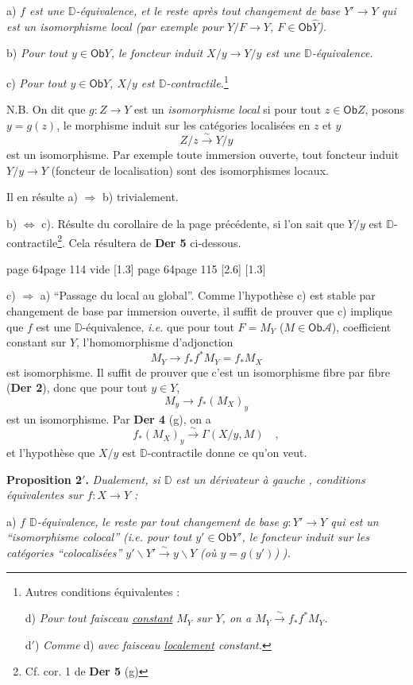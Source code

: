 \documentclass[11pt,leqno]{article}
\newcommand{\msp}[1]{%
  \begingroup\def\thismsp{#1}\def\blankmsp{page 114 vide}%
  \ifx\thismsp\blankmsp
    \marginnote{\scriptsize\sffamily [114: vide]}[1.3\baselineskip]%
  \else\def\followingmsp{page 115}%
    \ifx\thismsp\followingmsp
      \marginnote{\scriptsize\sffamily [page 115]}[2.6\baselineskip]%
    \else\marginnote{\scriptsize\sffamily [#1]}[1.3\baselineskip]\fi
  \fi\endgroup}
\newcommand{\DD}{\ensuremath{\mathbb{D}}}
\newcommand{\cA}{\ensuremath{\mathcal{A}}}
\newcommand{\Ob}{\ensuremath{\mathsf{Ob}}}
\newcommand{\isoto}{\overset{\sim}{\to}}
\newcommand{\isolongto}{\overset{\sim}{\longrightarrow}}
\begin{document}
a) \textit{$f$ est une $\DD$-équivalence, et le reste après tout changement de base $Y' \to Y$ qui est un isomorphisme local (par exemple pour $Y/F \to Y$, $F \in \Ob \widehat{Y}$).}

b) \textit{Pour tout $y \in \Ob Y$, le foncteur induit $X/y \to Y/y$ est une $\DD$-équivalence.}

c) \textit{Pour tout $y \in \Ob Y$, $X/y$ est $\DD$-contractile.}\footnote[25]{Autres conditions équivalentes :\par
\indent d) \textit{Pour tout faisceau \underline{constant} $M_Y$ sur $Y$, on a $M_Y \isoto f_*f^*M_Y$.}\par
\indent d$'$) \textit{Comme} d) \textit{avec faisceau \underline{localement} constant.}}

\noindent N.B. On dit que $g : Z \to Y$ est un \textit{isomorphisme local} si pour tout $z \in \Ob Z$, posons $y = g(z)$, le morphisme induit sur les catégories localisées en $z$ et $y$
\[
Z/z \isolongto Y/y
\]
est un isomorphisme. Par exemple toute immersion ouverte, tout foncteur induit $Y/y \to Y$ (foncteur de localisation) sont des isomorphismes locaux.

Il en résulte a) $\Rightarrow$ b) trivialement.

b) $\Leftrightarrow$ c). Résulte du corollaire de la page précédente, si l'on sait que $Y/y$ est $\DD$-contractile\footnote[26]{Cf. cor. 1 de \textbf{Der 5} (g)}. Cela résultera de \textbf{Der 5} ci-dessous.

\noindent\msp{page 64}

c) $\Rightarrow$ a) “Passage du local au global”. Comme l'hypothèse c) est stable par changement de base par immersion ouverte, il suffit de prouver que c) implique que $f$ est une $\DD$-équivalence, \textit{i.e.} que pour tout $F = M_Y$ ($M \in \Ob \cA$), coefficient constant sur $Y$, l'homomorphisme d'adjonction
\[
M_Y \longrightarrow f_*f^*M_Y = f_*M_X
\]
est isomorphisme. Il suffit de prouver que c'est un isomorphisme fibre par fibre (\textbf{Der 2}), donc que pour tout $y \in Y$,
\[
M_y \longrightarrow f_*(M_X)_y
\]
est un isomorphisme. Par \textbf{Der 4} (g), on a
\[
f_*(M_X)_y \isolongto \Gamma(X/y, M) \quad ,
\]
et l'hypothèse que $X/y$ est $\DD$-contractile donne ce qu'on veut.

\noindent\textbf{Proposition 2$'$.} \textit{Dualement, si $\DD$ est un dérivateur à gauche} \textit{, conditions équivalentes sur $f : X \to Y$ :}

a) \textit{$f$ $\DD$-équivalence,} \textit{le reste par tout changement de base $g : Y' \to Y$ qui est un “isomorphisme colocal” (i.e. pour tout $y' \in \Ob Y'$, le foncteur induit sur les catégories “colocalisées” $y'\backslash Y' \isolongto y\backslash Y$ (où $y = g(y')$)} \textit{).}
\end{document}
